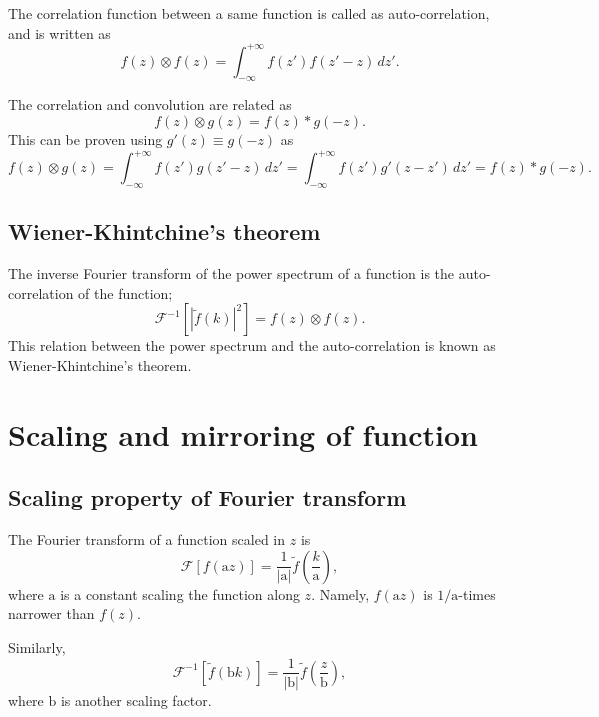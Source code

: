 \documentclass[a4paper]{article}
\newcommand{\ftf}[1]{{\mathcal{F}\left[#1\right]\xspace}}
\newcommand{\iftf}[1]{{\mathcal{F}^{-1}\left[#1\right]\xspace}}
\newcommand{\ftt}[1]{{\tilde{#1}\xspace}}
\newcommand{\cst}[1]{{\mathrm{#1}}\xspace}
\begin{document}
The correlation function between a same function is called as auto-correlation, and is written as
\begin{equation}
	f(z) \otimes f(z)  = \int_{-\infty}^{+\infty} f(z') f(z'-z)\, dz'.
\end{equation}

The correlation and convolution are related as 
\begin{equation}
	f(z) \otimes g(z) = f(z) * g(-z).
\end{equation}
This can be proven using $g'(z) \equiv g(-z)$ as
\begin{equation}
	f(z) \otimes g(z) = \int_{-\infty}^{+\infty} f(z') g(z'-z)\, dz'
	= \int_{-\infty}^{+\infty} f(z') g'(z-z')\, dz' = f(z) * g(-z).
\end{equation}


\subsection{Wiener-Khintchine’s theorem}
The inverse Fourier transform of the power spectrum of a function is the auto-correlation of the function;
\begin{equation}
	\iftf{ \left|\ftt{f}(k)\right|^2} = f(z) \otimes f(z).
\end{equation}
This relation between the power spectrum and the auto-correlation is known as Wiener-Khintchine’s theorem.

\section{Scaling and mirroring of function}
\subsection{Scaling property of Fourier transform}
The Fourier transform of a function scaled in $z$ is
\begin{equation}
	\label{eq:scale-z}
	\ftf{ f(\cst{a} z) } = \frac{1}{\left|\cst{a}\right|} \ftt{f}\left(\frac{k}{\cst{a}}\right),
\end{equation}
where $\cst{a}$ is a constant scaling the function along $z$.
Namely, $f(\cst{a}z)$ is $1/\cst{a}$-times narrower than $f(z)$. 

Similarly,
\begin{equation}
	\label{eq:scale-k}
	\iftf{ \ftt{f}(\cst{b} k) } = \frac{1}{\left|\cst{b}\right|} \ftt{f}\left(\frac{z}{\cst{b}}\right),
\end{equation}
where $\cst{b}$ is another scaling factor.
\end{document}
